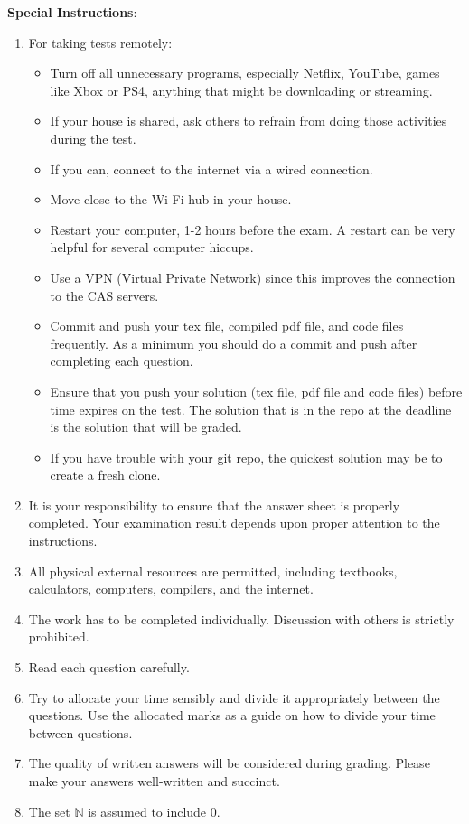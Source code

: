 \documentclass[12pt,fleqn]{examtst}
\begin{document}
\noindent
\textbf{Special Instructions}:

\begin{enumerate}

\item For taking tests remotely: 
\begin{itemize}
\item Turn off all unnecessary programs, especially Netflix, YouTube, games like
  Xbox or PS4, anything that might be downloading or streaming.
\item If your house is shared, ask others to refrain from doing those activities
  during the test.
\item If you can, connect to the internet via a wired connection.
\item Move close to the Wi-Fi hub in your house. 
\item Restart your computer, 1-2 hours before the exam. A restart can be very
  helpful for several computer hiccups.
\item Use a VPN (Virtual Private Network) since this improves the connection to
  the CAS servers.
\item Commit and push your tex file, compiled pdf file, and code files
  frequently.  As a minimum you should do a commit and push after completing
  each question.
\item Ensure that you push your solution (tex file, pdf file and code files)
  before time expires on the test.  The solution that is in the repo at the
  deadline is the solution that will be graded.
\item If you have trouble with your git repo, the quickest solution may be to
  create a fresh clone.
\end{itemize}
\item It is your responsibility to ensure that the answer sheet is properly
  completed. Your examination result depends upon proper attention to the
  instructions.
\item All physical external resources are permitted, including textbooks, calculators,
  computers, compilers, and the internet.
\item The work has to be completed individually.  Discussion with others is
  strictly prohibited.
\item Read each question carefully.
\item Try to allocate your time sensibly and divide it appropriately between the
  questions.  Use the allocated marks as a guide on how to divide your time
  between questions.
\item The quality of written answers will be considered during grading.  Please
  make your answers well-written and succinct.
\item The set $\mathbb{N}$ is assumed to include $0$.
\end{enumerate}
\end{document}
